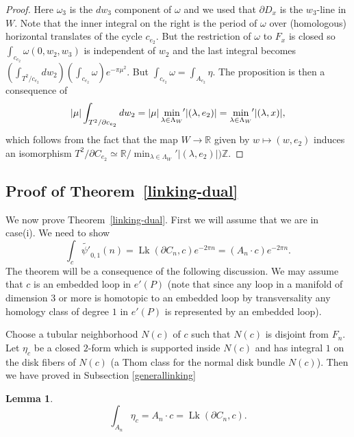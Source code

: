 \documentclass[12pt,leqno]{amsart}
\numberwithin{equation}{section}
\theoremstyle{plain}
\newtheorem{lemma}[theorem]{Lemma}
\theoremstyle{definition}
\theoremstyle{remark}
\newcommand{\R}{\mathbb{R}}
\newcommand{\Z}{\mathbb{Z}}
\newcommand{\la}{\lambda}
\newcommand{\Lk}{\operatorname{Lk}}
\begin{document}
\begin{proof}
Here $\omega_3$ is the $dw_3$ component of $\omega$ and we used that $\partial D_{x}$ is the $w_3$-line in $W$. Note that the inner integral on the right is the period 
of $\omega$ over (homologous) horizontal translates of the cycle $c_{e_2}$. But the restriction of $\omega$ to $F_x$ is closed so $\int_{c_{e_2}} \omega(0,w_2,w_3)$ is independent of $w_2$ and the last integral becomes
$\left(  \int_{T^2/ c_{e_2}} dw_2 \right)\left( \int_{c_{e_2}} \omega \right)e^{- \pi \mu^2}$. 
 But $\int_{c_{e_2}} \omega = \int_{A_{e_2}} \eta$. The proposition is then a consequence of
\[
|\mu| \int_{T^2/ \partial c_{e_2}} dw_2  = |\mu|  \min_{\la \in \Lambda_W}  {\hspace{-2pt}'} |(\la,e_2)| = \min_{\la \in \Lambda_W}  {\hspace{-2pt}'} |(\la,x)|,
\] 
which follows from the fact that the map $W \to \R$ given by $w \mapsto (w,e_2)$ induces an isomorphism $T^2/ \partial C_{e_2} \simeq \R / \min_{\la \in \Lambda_W}'|(\la,e_2)|)\Z$.  

\end{proof}

\subsection{Proof of Theorem~\ref{linking-dual}}\label{W-currents}

We now prove Theorem~\ref{linking-dual}. First we will assume that we are in case(i). We need to show  
\[
\int_c  \tilde{\psi'}_{0,1}(n) = \Lk(\partial C_n,c) e^{-2\pi n} =  (A_n \cdot c) e^{-2\pi n}.
\]
The theorem will be a consequence of the following discussion.  
We may assume that $c$ is an embedded loop in $e'(P)$ (note that since any loop in a manifold of dimension $3$ or more is homotopic to an embedded loop by transversality any homology class of degree $1$ in $e'(P)$ is represented by an embedded loop). 

Choose a tubular neighborhood $N(c)$ of $c$ such that $N(c)$ is disjoint from $F_n$. Let $\eta_c$ be a closed $2$-form which is supported inside $N(c)$ and has integral $1$ on the disk fibers of $N(c)$ (a Thom class for the normal disk bundle $N(c)$).
Then we have proved in Subsection \ref{generallinking}  

\begin{lemma}\label{integrallink}
\begin{equation} \label{secondformula}
\int_{A_n} \eta_c= A_n \cdot  c= \Lk(\partial C_n, c).
\end{equation}
\end{lemma}
\end{document}
